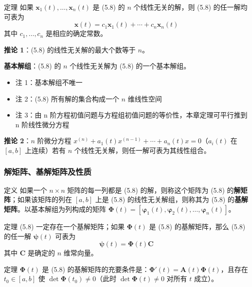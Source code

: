 \begin{myTheorem}{定理}
如果 $\mathbf{x}_1(t), \ldots, \mathbf{x}_n(t)$ 是 (5.8) 的 $n$ 个线性无关的解，则 (5.8) 的任一解均可表为
$$\mathbf{x}(t) = c_1\mathbf{x}_1(t) + \cdots + c_n\mathbf{x}_n(t)$$
其中 $c_1, \ldots, c_n$ 是相应的确定常数。
\end{myTheorem}

\textbf{推论 1}：(5.8) 的线性无关解的最大个数等于 $n$。

\textbf{基本解组}：(5.8) 的 $n$ 个线性无关解为 (5.8) 的一个基本解组。
\begin{itemize}
    \item 注 1：基本解组不唯一
    \item 注 2：(5.8) 所有解的集合构成一个 $n$ 维线性空间
    \item 注 3：由 n 阶方程初值问题与方程组初值问题的等价性，本章定理可平行推到 n 阶线性微分方程
\end{itemize}

\textbf{推论 2}：$n$ 阶微分方程 $x^{(n)} + a_1(t)x^{(n-1)} + \cdots + a_n(t)x = 0$（$a_i(t)$ 在 $[a,b]$ 上连续）若有 $n$ 个线性无关解，则任一解可表为其线性组合。

\subsubsection{解矩阵、基解矩阵及性质}

\begin{mydefinition}{定义}
如果一个 $n\times n$ 矩阵的每一列都是 (5.8) 的解，则称这个矩阵为 (5.8) 的\textbf{解矩阵}；如果该矩阵的列在 $[a,b]$ 上是 (5.8) 的线性无关解组，则称其为 (5.8) 的\textbf{基解矩阵}。以基本解组为列构成的矩阵 $\boldsymbol{\Phi}(t) = [\boldsymbol{\varphi}_1(t), \boldsymbol{\varphi}_2(t), \ldots, \boldsymbol{\varphi}_n(t)]$。
\end{mydefinition}

\begin{myTheorem}{定理}
(5.8) 一定存在一个基解矩阵；如果 $\boldsymbol{\Phi}(t)$ 是 (5.8) 的基解矩阵，那么 (5.8) 的任一解 $\boldsymbol{\psi}(t)$ 可表为
\begin{equation}\boldsymbol{\psi}(t) = \boldsymbol{\Phi}(t)\mathbf{C} \tag{5.15}\end{equation}
其中 $\mathbf{C}$ 是确定的 $n$ 维常向量。
\end{myTheorem}

\begin{myTheorem}{定理}
$\boldsymbol{\Phi}(t)$ 是 (5.8) 的基解矩阵的充要条件是：$\boldsymbol{\Phi}'(t) = \mathbf{A}(t)\boldsymbol{\Phi}(t)$，且存在 $t_0 \in [a,b]$ 使 $\det\boldsymbol{\Phi}(t_0) \neq 0$（此时 $\det\boldsymbol{\Phi}(t) \neq 0$ 对所有 $t$ 成立）。
\end{myTheorem}

